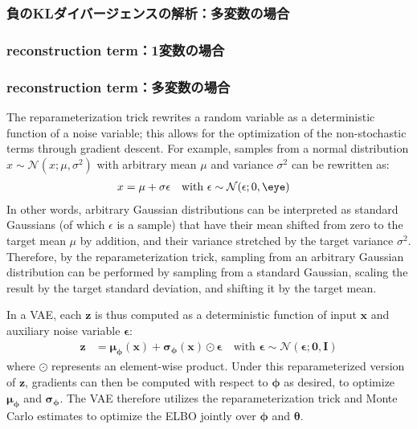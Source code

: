 \subsubsection{負のKLダイバージェンスの解析：多変数の場合}

\subsubsection{reconstruction term：1変数の場合}

\subsubsection{reconstruction term：多変数の場合}

The reparameterization trick rewrites a random variable as a deterministic function of a noise variable; this allows for the optimization of the non-stochastic terms through gradient descent.  For example, samples from a normal distribution $x \sim \mathcal{N}(x;\mu, \sigma^2)$ with arbitrary mean $\mu$ and variance $\sigma^2$ can be rewritten as:
\begin{align*}
    x &= \mu + \sigma\epsilon \quad \text{with } \epsilon \sim \mathcal{N}(\epsilon; 0, \eye)
\end{align*}
In other words, arbitrary Gaussian distributions can be interpreted as standard Gaussians (of which $\epsilon$ is a sample) that have their mean shifted from zero to the target mean $\mu$ by addition, and their variance stretched by the target variance $\sigma^2$.  Therefore, by the reparameterization trick, sampling from an arbitrary Gaussian distribution can be performed by sampling from a standard Gaussian, scaling the result by the target standard deviation, and shifting it by the target mean.

In a VAE, each $\bm{z}$ is thus computed as a deterministic function of input $\bm{x}$ and auxiliary noise variable $\bm{\epsilon}$:
\begin{align*}
    \bm{z} &= \bm{\mu}_{\bm{\phi}}(\bm{x}) + \bm{\sigma}_{\bm{\phi}}(\bm{x})\odot\bm{\epsilon} \quad \text{with } \bm{\epsilon} \sim \mathcal{N}(\bm{\epsilon};\bm{0}, \textbf{I})
\end{align*}
where $\odot$ represents an element-wise product.  Under this reparameterized version of $\bm{z}$, gradients can then be computed with respect to $\bm{\phi}$ as desired, to optimize $\bm{\mu}_{\bm{\phi}}$ and $\bm{\sigma}_{\bm{\phi}}$.  The VAE therefore utilizes the reparameterization trick and Monte Carlo estimates to optimize the ELBO jointly over $\bm{\phi}$ and $\bm{\theta}$.

